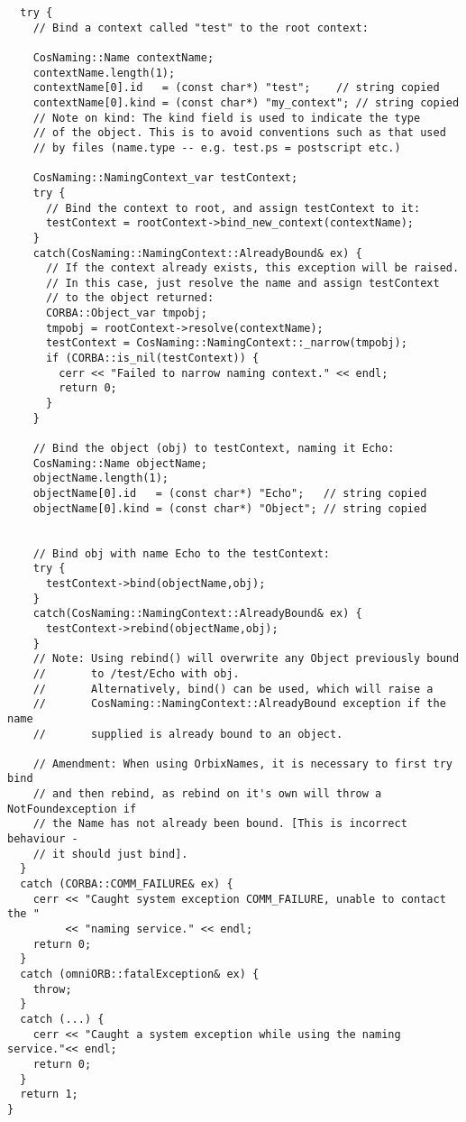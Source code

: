 \documentclass[11pt,twoside,onecolumn]{book}
\begin{document}
{\begin{verbatim}
  try {
    // Bind a context called "test" to the root context:

    CosNaming::Name contextName;
    contextName.length(1);
    contextName[0].id   = (const char*) "test";    // string copied
    contextName[0].kind = (const char*) "my_context"; // string copied    
    // Note on kind: The kind field is used to indicate the type
    // of the object. This is to avoid conventions such as that used
    // by files (name.type -- e.g. test.ps = postscript etc.)

    CosNaming::NamingContext_var testContext;
    try {
      // Bind the context to root, and assign testContext to it:
      testContext = rootContext->bind_new_context(contextName);
    }
    catch(CosNaming::NamingContext::AlreadyBound& ex) {
      // If the context already exists, this exception will be raised.
      // In this case, just resolve the name and assign testContext
      // to the object returned:
      CORBA::Object_var tmpobj;
      tmpobj = rootContext->resolve(contextName);
      testContext = CosNaming::NamingContext::_narrow(tmpobj);
      if (CORBA::is_nil(testContext)) {
        cerr << "Failed to narrow naming context." << endl;
        return 0;
      }
    } 

    // Bind the object (obj) to testContext, naming it Echo:
    CosNaming::Name objectName;
    objectName.length(1);
    objectName[0].id   = (const char*) "Echo";   // string copied
    objectName[0].kind = (const char*) "Object"; // string copied


    // Bind obj with name Echo to the testContext:
    try {
      testContext->bind(objectName,obj);
    }
    catch(CosNaming::NamingContext::AlreadyBound& ex) {
      testContext->rebind(objectName,obj);
    }
    // Note: Using rebind() will overwrite any Object previously bound 
    //       to /test/Echo with obj.
    //       Alternatively, bind() can be used, which will raise a
    //       CosNaming::NamingContext::AlreadyBound exception if the name
    //       supplied is already bound to an object.

    // Amendment: When using OrbixNames, it is necessary to first try bind
    // and then rebind, as rebind on it's own will throw a NotFoundexception if
    // the Name has not already been bound. [This is incorrect behaviour -
    // it should just bind].
  }
  catch (CORBA::COMM_FAILURE& ex) {
    cerr << "Caught system exception COMM_FAILURE, unable to contact the "
         << "naming service." << endl;
    return 0;
  }
  catch (omniORB::fatalException& ex) {
    throw;
  }
  catch (...) {
    cerr << "Caught a system exception while using the naming service."<< endl;
    return 0;
  }
  return 1;
}
\end{verbatim}
\newpage

}
\end{document}
